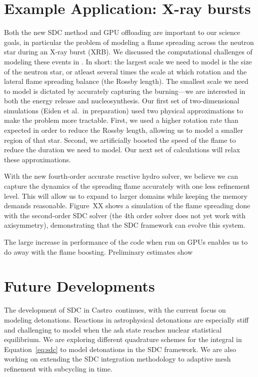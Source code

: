 \documentclass[a4paper]{jpconf}
\newcommand{\castro}{{\sffamily Castro}}
\begin{document}
\section{Example Application: X-ray bursts}

Both the new SDC method and GPU offloading are important to our
science goals, in particular the problem of modeling a flame spreading
across the neutron star during an X-ray burst (XRB).  We discussed the
computational challenges of modeling these events in
\cite{astronum:2018}.  In short: the largest scale we need to model is
the size of the neutron star, or atleast several times the scale at
which rotation and the lateral flame spreading balance (the Rossby
length).  The smallest scale we need to model is dictated by
accurately capturing the burning---we are interested in both the
energy release and nucleosynthesis.  Our first set of two-dimensional simulations
(Eiden et al.\ in preparation) used two physical approximations to
make the problem more tractable.  First, we used a higher rotation
rate than expected in order to reduce the Rossby length, allowing us
to model a smaller region of that star.  Second, we artificially
boosted the speed of the flame to reduce the duration we need to
model.  Our next set of calculations will relax these approximations.

With the new fourth-order accurate reactive hydro solver, we believe
we can capture the dynamics of the spreading flame accurately with one
less refinement level.  This will allow us to expand to larger domains
while keeping the memory demands reasonable.  Figure~XX shows a
simulation of the flame spreading done with the second-order SDC
solver (the 4th order solver does not yet work with axisymmetry),
demonstrating that the SDC framework can evolve this system.

The large increase in performance of the code when run on GPUs enables
us to do away with the flame boosting.  Preliminary estimates show


\section{Future Developments}

The development of SDC in \castro\ continues, with the current focus
on modeling detonations.  Reactions in astrophysical detonations are
especially stiff and challenging to model when the ash state reaches
nuclear statistical equilibrium.  We are exploring different
quadrature schemes for the integral in Equation~\ref{eq:sdc} to model
detonations in the SDC framework.  We are also working on extending
the SDC integration methodology to adaptive mesh refinement with
subcycling in time.
\end{document}

